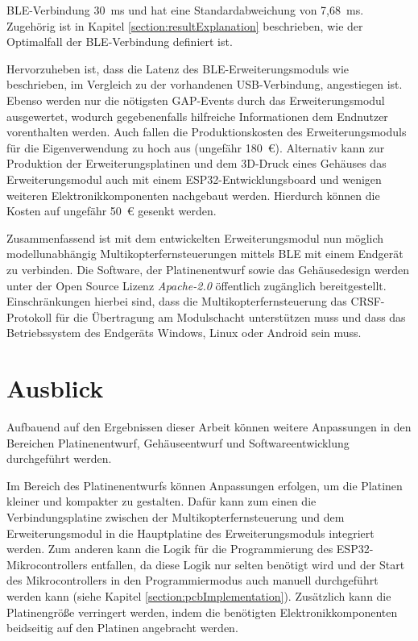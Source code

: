 \ac{BLE}-Verbindung 30~ms und hat eine Standardabweichung von 7,68~ms. Zugehörig ist in Kapitel \ref{section:resultExplanation} beschrieben, wie der Optimalfall der \ac{BLE}-Verbindung definiert ist.

Hervorzuheben ist, dass die Latenz des \ac{BLE}-Erweiterungsmoduls wie beschrieben, im Vergleich zu der vorhandenen \acs{USB}-Verbindung, angestiegen ist. Ebenso werden nur die nötigsten \ac{GAP}-Events durch das Erweiterungsmodul ausgewertet, wodurch gegebenenfalls hilfreiche Informationen dem Endnutzer vorenthalten werden. Auch fallen die Produktionskosten des Erweiterungsmoduls für die Eigenverwendung zu hoch aus (ungefähr 180~€). Alternativ kann zur Produktion der Erweiterungsplatinen und dem 3D-Druck eines Gehäuses das Erweiterungsmodul auch mit einem ESP32-Entwicklungsboard und wenigen weiteren Elektronikkomponenten nachgebaut werden. Hierdurch können die Kosten auf ungefähr 50~€ gesenkt werden. 

Zusammenfassend ist mit dem entwickelten Erweiterungsmodul nun möglich modellunabhängig Multikopterfernsteuerungen mittels \ac{BLE} mit einem Endgerät zu verbinden. Die Software, der Platinenentwurf sowie das Gehäusedesign werden unter der Open Source Lizenz \textit{Apache-2.0} öffentlich zugänglich bereitgestellt. Einschränkungen hierbei sind, dass die Multikopterfernsteuerung das CRSF-Protokoll für die Übertragung am Modulschacht unterstützen muss und dass das Betriebssystem des Endgeräts Windows, Linux oder Android sein muss.

\section{Ausblick}
Aufbauend auf den Ergebnissen dieser Arbeit können weitere Anpassungen in den Bereichen Platinenentwurf, Gehäuseentwurf und Softwareentwicklung durchgeführt werden.

Im Bereich des Platinenentwurfs können Anpassungen erfolgen, um die Platinen kleiner und kompakter zu gestalten. Dafür kann zum einen die Verbindungsplatine zwischen der Multikopterfernsteuerung und dem Erweiterungsmodul in die Hauptplatine des Erweiterungsmoduls integriert werden. Zum anderen kann die Logik für die Programmierung des ESP32-Mikrocontrollers entfallen, da diese Logik nur selten benötigt wird und der Start des Mikrocontrollers in den Programmiermodus auch manuell durchgeführt werden kann (siehe Kapitel \ref{section:pcbImplementation}). Zusätzlich kann die Platinengröße verringert werden, indem die benötigten Elektronikkomponenten beidseitig auf den Platinen angebracht werden.

